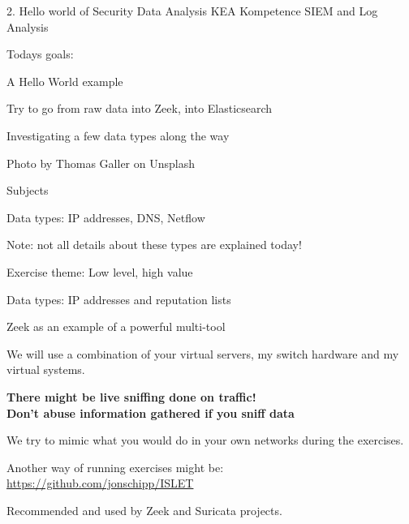 \documentclass[Screen16to9,17pt]{foils}
\begin{document}
\mytitlepage
{2. Hello world of Security Data Analysis}
{KEA Kompetence SIEM and Log Analysis}



Todays goals:
\begin{list2}
\item A Hello World example
\item Try to go from raw data into Zeek, into Elasticsearch
\item Investigating a few data types along the way
\end{list2}

Photo by Thomas Galler on Unsplash





\begin{list1}
\item Subjects
\begin{list2}
\item Data types: IP addresses, DNS, Netflow
\item Note: not all details about these types are explained today!
\end{list2}
\item Exercise theme: Low level, high value
\begin{list2}
\item Data types: IP addresses and reputation lists
\item Zeek as an example of a powerful multi-tool
\end{list2}
\end{list1}



We will use a combination of your virtual servers, my switch hardware and my virtual systems.

\vskip 1cm
{\Large \bf There might be live sniffing done on traffic!\\
Don't abuse information gathered if you sniff data}

We try to mimic what you would do in your own networks during the exercises.

Another way of running exercises might be:\\
\url{https://github.com/jonschipp/ISLET}

Recommended and used by Zeek and Suricata projects.


\end{document}
